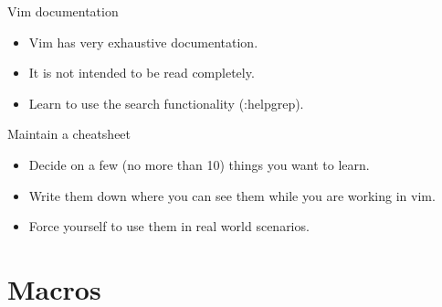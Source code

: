 \documentclass{beamer}
\begin{document}
    \begin{frame}{Vim documentation}
        \begin{itemize}
            \item Vim has very exhaustive documentation.
            \item It is not intended to be read completely.  %
            \item Learn to use the search functionality (:helpgrep).
        \end{itemize}
    \end{frame}
    \begin{frame}{Maintain a cheatsheet}
        \begin{itemize}
            \item Decide on a few (no more than 10) things you want to learn.
            \item Write them down where you can see them while you are working in vim.
            \item Force yourself to use them in real world scenarios.
        \end{itemize}
    \end{frame}
    \section{Macros}
\end{document}
